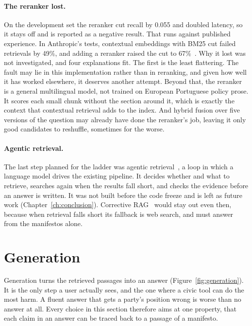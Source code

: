 \paragraph{The reranker lost.} On the development set the reranker cut recall
by 0.055 and doubled latency, so it stays off and is reported as a negative
result. That runs against published experience. In Anthropic's tests,
contextual embeddings with BM25 cut failed retrievals by 49\%, and adding a
reranker raised the cut to 67\%~\citep{anthropic2024contextual}.
Why it lost was not investigated, and four explanations fit. The first is
the least flattering. The fault may lie in this implementation rather than in
reranking, and given how well it has worked elsewhere, it deserves another
attempt. Beyond that, the reranker is
a general multilingual model, not trained on European Portuguese policy prose.
It scores each small chunk without the section around it, which is exactly the
context that contextual retrieval adds to the index. And hybrid fusion over
five versions of the question may already have done the reranker's job,
leaving it only good candidates to reshuffle, sometimes for the worse.

\paragraph{Agentic retrieval.} \label{subsec:agentic} The last step planned for the ladder was agentic
retrieval~\citep{agentic-rag}, a loop in which a language model drives the
existing pipeline. It decides whether and what to retrieve, searches again
when the results fall short, and checks the evidence before an answer is
written. It was not built before the code freeze and is left as future work
(Chapter~\ref{ch:conclusion}). Corrective RAG~\citep{crag} would stay out
even then, because when retrieval falls short
its fallback is web search, and \sysname{} must answer from the manifestos
alone.

\section{Generation} \label{sec:generation}

Generation turns the retrieved passages into an answer
(Figure~\ref{fig:generation}). It is the only step a user actually sees, and
the one where a civic tool can do the most harm. A fluent answer that gets a
party's position wrong is worse than no answer at all. Every choice in this
section therefore aims at one property, that each claim in an answer can be
traced back to a passage of a manifesto.

